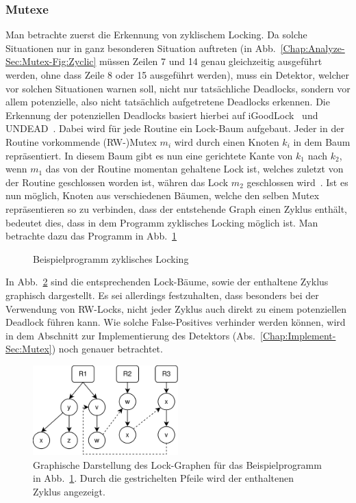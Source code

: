 \subsubsection{Mutexe}
Man betrachte zuerst die Erkennung von zyklischem Locking. 
Da solche Situationen nur in ganz besonderen Situation auftreten 
(in Abb.~\ref{Chap:Analyze-Sec:Mutex-Fig:Zyclic} müssen Zeilen 
7 und 14 genau gleichzeitig ausgeführt werden, ohne dass Zeile 8 oder 15 ausgeführt werden), muss 
ein Detektor, welcher vor solchen Situationen warnen soll, nicht nur tatsächliche Deadlocks, sondern
vor allem potenzielle, also nicht tatsächlich aufgetretene Deadlocks erkennen. Die Erkennung der 
potenziellen Deadlocks basiert hierbei auf iGoodLock~\cite{iGoodLock} und UNDEAD~\cite{Undead}. 
Dabei wird für jede Routine ein Lock-Baum aufgebaut. Jeder in der Routine vorkommende 
(RW-)Mutex $m_i$ wird durch einen Knoten $k_i$ in dem Baum repräsentiert. 
In diesem Baum gibt es nun eine gerichtete Kante von $k_1$ nach $k_2$, wenn 
$m_1$ das
von der Routine momentan gehaltene Lock ist, welches zuletzt von der Routine 
geschlossen worden ist, währen das Lock $m_2$ geschlossen wird~\cite{lock-tree}.
Ist es nun möglich, Knoten aus verschiedenen Bäumen, welche den selben
Mutex repräsentieren so zu verbinden, dass der entstehende Graph einen Zyklus 
enthält, bedeutet dies, dass in dem Programm zyklisches Locking möglich ist. 
Man betrachte dazu das Programm in Abb.~\ref{Chap:Analyze-Sec:Mutex-Fig:ZyclicTreeCode}
\begin{figure}[h!]
  
  \caption{Beispielprogramm zyklisches Locking}
  \label{Chap:Analyze-Sec:Mutex-Fig:ZyclicTreeCode}
\end{figure}
In Abb.~\ref{Chap:Analyze-Sec:Mutex-Fig:ZyclicTreeImg} sind die entsprechenden
Lock-Bäume, sowie der enthaltene Zyklus graphisch dargestellt. Es sei allerdings 
festzuhalten, dass besonders bei der Verwendung von RW-Locks, nicht jeder 
Zyklus auch direkt zu einem potenziellen Deadlock führen kann. Wie solche 
False-Positives verhinder werden können, wird in dem Abschnitt zur Implementierung
des Detektors (Abs.~\ref{Chap:Implement-Sec:Mutex}) noch genauer betrachtet.
\begin{figure}[h!]
  \centering
  \includegraphics[width=0.5\textwidth]{img/tree_example.eps}
  \caption{Graphische Darstellung des Lock-Graphen für das Beispielprogramm in 
    Abb.~\ref{Chap:Analyze-Sec:Mutex-Fig:ZyclicTreeCode}. Durch die gestrichelten 
    Pfeile wird der enthaltenen Zyklus angezeigt.}
    \label{Chap:Analyze-Sec:Mutex-Fig:ZyclicTreeImg}
\end{figure}



